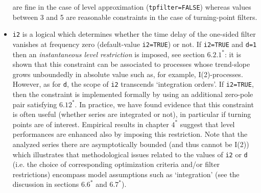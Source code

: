 \documentclass[a4paper]{article}
\begin{document}
\begin{itemize}
  are fine in the case of level approximation
  (\texttt{tpfilter=FALSE}) whereas values between 3 and 5 are
  reasonable constraints in the case of turning-point filters. 
\item \texttt{i2} is a logical which determines whether the time delay
  of the one-sided filter vanishes at frequency zero (default-value
  \texttt{i2=TRUE}) or not. If \texttt{i2=TRUE} and \texttt{d=1} then
  an \emph{instantaneous level restriction} is imposed, see section
  $6.2.1^*$: it is shown that this constraint can be associated to
  processes whose trend-slope grows unboundedly in absolute value such
  as, for example, I(2)-processes. However, as for \texttt{d}, the
  scope of \texttt{i2} transcends `integration orders'. If
  \texttt{i2=TRUE}, then the constraint is implemented formally by
  using an additional zero-pole pair satisfying $6.12^*$. In practice,
  we have found evidence that this constraint is often useful (whether
  series are integrated or not), in particular if turning points are
  of interest. Empirical results in chapter $4^*$ suggest that level
  performances are enhanced also by imposing this restriction. Note
  that the analyzed series there are asymptotically bounded (and thus
  cannot be I(2)) which illustrates that methodological issues related
  to the values of \texttt{i2} or \texttt{d} (i.e. the choice of
  corresponding optimization criteria and/or filter restrictions)
  encompass model assumptions such as `integration' (see the
  discussion in sections $6.6^*$ and $6.7^*$). 
\end{itemize}
\end{document}
